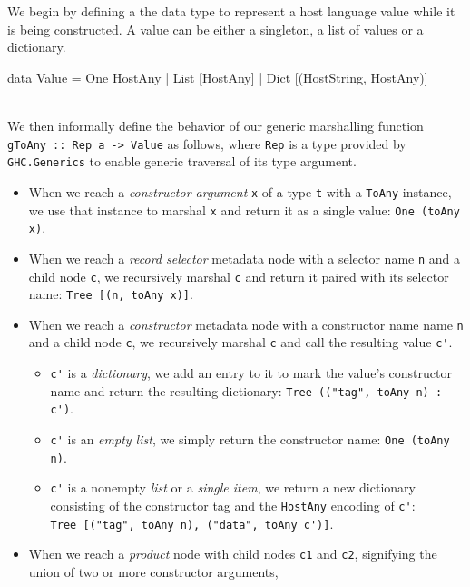 \documentclass[preprint]{sigplanconf}
\begin{document}
We begin by defining a the data type to represent a host language value while
it is being constructed. A value can be either a singleton, a list of
values or a dictionary.\\
\begin{code}
  data Value
    = One HostAny
    | List [HostAny]
    | Dict [(HostString, HostAny)]
\end{code}\\
We then informally define the behavior of our generic marshalling function
\lstinline!gToAny :: Rep a -> Value! as follows, where \lstinline!Rep! is
a type provided by \lstinline!GHC.Generics! to enable generic traversal
of its type argument.

\begin{itemize}
\item
  When we reach a \emph{constructor argument} \lstinline!x! of a type
  \lstinline!t! with a \lstinline!ToAny! instance, we use that instance to
  marshal \lstinline!x! and return it as a single value:
  \lstinline!One (toAny x)!.
\item
  When we reach a \emph{record selector} metadata node with a selector
  name \lstinline!n! and a child node \lstinline!c!, we recursively marshal
  \lstinline!c! and return it paired with its selector name:
  \lstinline!Tree [(n, toAny x)]!.
\item
  When we reach a \emph{constructor} metadata node with a constructor name
  name \lstinline!n! and a child node \lstinline!c!, we recursively marshal
  \lstinline!c! and call the resulting value \lstinline!c'!.
  \begin{itemize}
  \item
    \lstinline!c'! is a \emph{dictionary}, we add an entry to it to mark the
    value's constructor name and return the resulting dictionary:
    \lstinline!Tree (("tag", toAny n) : c')!.
  \item
    \lstinline!c'! is an \emph{empty list}, we simply return the constructor
    name:
    \lstinline!One (toAny n)!.
  \item
    \lstinline!c'! is a nonempty \emph{list} or a \emph{single item},
    we return a new dictionary consisting of the constructor tag and the
    \lstinline!HostAny! encoding of \lstinline!c'!:\\
    \lstinline!Tree [("tag", toAny n), ("data", toAny c')]!.
  \end{itemize}
\item
  When we reach a \emph{product} node with child nodes \lstinline!c1! and
  \lstinline!c2!, signifying the union of two or more constructor arguments,

\end{itemize}
\end{document}
